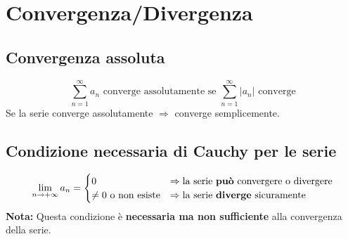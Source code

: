 \documentclass[10pt, a4paper]{article}
\begin{document}
\section{Convergenza/Divergenza}
    \subsection{Convergenza assoluta}
        \begin{equation*}
            \sum_{n=1}^{\infty}a_n \text{ converge assolutamente se } \sum_{n=1}^{\infty}\left|a_n\right| \text{ converge}
        \end{equation*}
        Se la serie converge assolutamente $\Rightarrow$ converge semplicemente.
    \subsection{Condizione necessaria di Cauchy per le serie}
        \begin{equation*}
            \lim_{n\rightarrow+\infty}a_n = \begin{cases}
                0 & \Rightarrow \text{la serie \textbf{può} convergere o divergere} \\
                \neq 0 \text{ o non esiste} & \Rightarrow \text{la serie \textbf{diverge} sicuramente}
            \end{cases}
        \end{equation*}
        \textbf{Nota: } Questa condizione è \textbf{necessaria ma non sufficiente} alla convergenza della serie.
\end{document}
